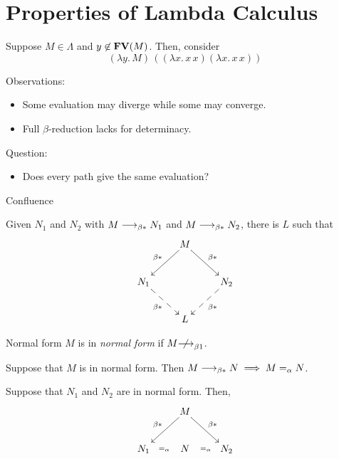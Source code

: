\section{Properties of Lambda Calculus}

\begin{frame}
  \begin{example}
    Suppose $M \in \Lambda$ and $y \not\in \mathbf{FV}(M)$. 
    Then, consider 
    \[
      (\lambda y.\, M)\, ((\lambda x.\, x\,x)(\lambda x.\, x\, x))
    \]
  \end{example}
  Observations:
  \begin{itemize}
    \item Some evaluation may diverge while some may converge.
    \item Full $\beta$-reduction lacks for determinacy. 
  \end{itemize}
  Question:
  \begin{itemize}
    \item Does every path give the same evaluation?
  \end{itemize}
\end{frame}

\begin{frame}{Confluence}
\begin{theorem}
  Given $N_1$ and $N_2$ with $M \longrightarrow_{\beta*} N_1$ and $M\longrightarrow_{\beta*} N_2$, there is $L$
  such that
  \[
    \xymatrix{
      & M \ar[rd]^{\beta*} \ar[ld]_{\beta*} \\
      N_1 \ar@{-->}[rd]_{\beta*} & & N_2 \ar@{-->}[ld]^{\beta*} \\
      & L
    }
  \]
\end{theorem}
\end{frame}

\begin{frame}{Normal form}
  $M$ is in \emph{normal form} if $M \notonereduce$. 

  \begin{lemma}\label{lem:normal-no-reduction}
    Suppose that $M$ is in normal form. Then 
      $M \longrightarrow_{\beta*} N \implies M =_\alpha N$.
  \end{lemma}

  \begin{corollary}\label{coro:uniqueness-normal}
    Suppose that $N_1$ and $N_2$ are in normal form. Then, 
    \[
      \xymatrix{
        & M \ar[rd]^{\beta*} \ar[ld]_{\beta*} \\
        N_1 \ar@{}[r]|{=_{\alpha}} & N & N_2 \ar@{}[l]|{=_\alpha} \\
      }
    \]
  \end{corollary}
\end{frame}

